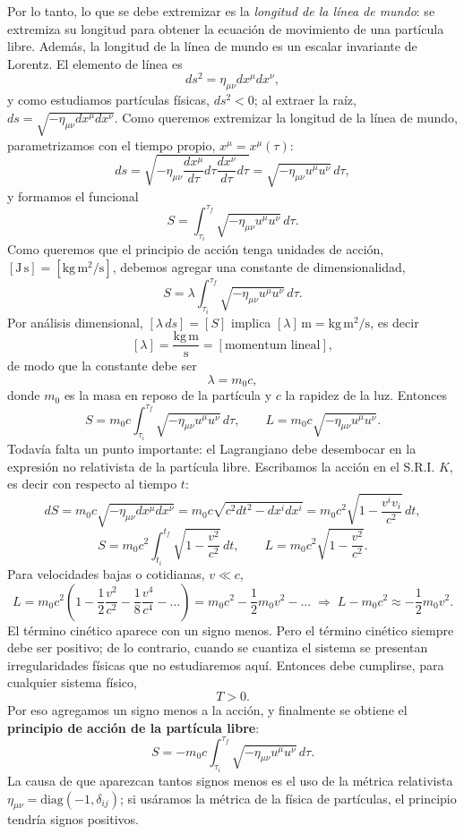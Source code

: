 Por lo tanto, lo que se debe extremizar es la \emph{longitud de la línea
de mundo}: se extremiza su longitud para obtener la ecuación de
movimiento de una partícula libre. Además, la longitud de la línea de
mundo es un escalar invariante de Lorentz. El elemento de línea es
\[
ds^2 = \eta_{\mu\nu}dx^\mu dx^\nu, \tag{2}
\]
y como estudiamos partículas físicas, $ds^2<0$; al extraer la raíz,
$ds=\sqrt{-\eta_{\mu\nu}dx^\mu dx^\nu}$. Como queremos extremizar la
longitud de la línea de mundo, parametrizamos con el tiempo propio,
$x^\mu=x^\mu(\tau)$:
\[
ds = \sqrt{-\eta_{\mu\nu}\frac{dx^\mu}{d\tau}d\tau\frac{dx^\nu}{d\tau}
d\tau} = \sqrt{-\eta_{\mu\nu}u^\mu u^\nu}\,d\tau,
\]
y formamos el funcional
\[
S = \int_{\tau_i}^{\tau_f}\sqrt{-\eta_{\mu\nu}u^\mu u^\nu}\,d\tau .
\tag{3}
\]
Como queremos que el principio de acción tenga unidades de acción,
$[\text{J}\,\text{s}]=[\text{kg}\,\text{m}^2/\text{s}]$, debemos agregar
una constante de dimensionalidad,
\[
S = \lambda\int_{\tau_i}^{\tau_f}\sqrt{-\eta_{\mu\nu}u^\mu u^\nu}\,d\tau .
\tag{4}
\]
Por análisis dimensional, $[\lambda\,ds]=[S]$ implica
$[\lambda]\,\text{m}=\text{kg}\,\text{m}^2/\text{s}$, es decir
\[
[\lambda] = \frac{\text{kg}\,\text{m}}{\text{s}} = [\text{momentum
lineal}], \tag{5}
\]
de modo que la constante debe ser
\[
\lambda = m_0c, \tag{6}
\]
donde $m_0$ es la masa en reposo de la partícula y $c$ la rapidez de la
luz. Entonces
\[
S = m_0c\int_{\tau_i}^{\tau_f}\sqrt{-\eta_{\mu\nu}u^\mu u^\nu}\,d\tau,
\qquad L = m_0c\sqrt{-\eta_{\mu\nu}u^\mu u^\nu}. \tag{7, 8}
\]
Todavía falta un punto importante: el Lagrangiano debe desembocar en la
expresión no relativista de la partícula libre. Escribamos la acción en
el S.R.I. $K$, es decir con respecto al tiempo $t$:
\[
dS = m_0c\sqrt{-\eta_{\mu\nu}dx^\mu dx^\nu} = m_0c\sqrt{c^2dt^2-dx^idx^i}
= m_0c^2\sqrt{1-\frac{v^iv_i}{c^2}}\,dt,
\]
\[
S = m_0c^2\int_{t_i}^{t_f}\sqrt{1-\frac{v^2}{c^2}}\,dt, \qquad
L = m_0c^2\sqrt{1-\frac{v^2}{c^2}} . \tag{9, 10}
\]
Para velocidades bajas o cotidianas, $v\ll c$,
\[
L = m_0c^2\left(1-\frac12\frac{v^2}{c^2}-\frac18\frac{v^4}{c^4}-\dots
\right) = m_0c^2-\frac12m_0v^2-\dots \;\Longrightarrow\; L-m_0c^2
\approx-\frac12m_0v^2 .
\]
El término cinético aparece con un signo menos. Pero el término cinético
siempre debe ser positivo; de lo contrario, cuando se cuantiza el sistema
se presentan irregularidades físicas que no estudiaremos aquí. Entonces
debe cumplirse, para cualquier sistema físico,
\[
T>0. \tag{11}
\]
Por eso agregamos un signo menos a la acción, y finalmente se obtiene el
\textbf{principio de acción de la partícula libre}:
\[
S = -m_0c\int_{\tau_i}^{\tau_f}\sqrt{-\eta_{\mu\nu}u^\mu u^\nu}\,d\tau .
\tag{12}
\]
La causa de que aparezcan tantos signos menos es el uso de la métrica
relativista $\eta_{\mu\nu}=\text{diag}(-1,\delta_{ij})$; si usáramos la
métrica de la física de partículas, el principio tendría signos
positivos.


